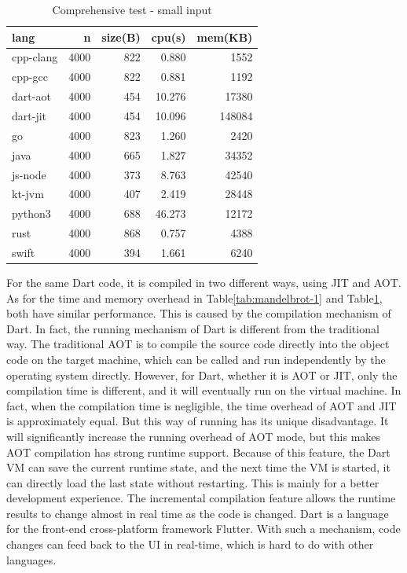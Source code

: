 \begin{table}[htbp]
    \caption{Comprehensive test - small input}
    \label{tab:mandelbrot-2}
    \begin{center}
        \begin{tabular}{lrrrr}
            \toprule
            lang      & n    & size(B) & cpu(s) & mem(KB) \\
            \midrule
            cpp-clang & 4000 & 822     & 0.880  & 1552    \\
            cpp-gcc   & 4000 & 822     & 0.881  & 1192    \\
            dart-aot  & 4000 & 454     & 10.276 & 17380   \\
            dart-jit  & 4000 & 454     & 10.096 & 148084  \\
            go        & 4000 & 823     & 1.260  & 2420    \\
            java      & 4000 & 665     & 1.827  & 34352   \\
            js-node   & 4000 & 373     & 8.763  & 42540   \\
            kt-jvm    & 4000 & 407     & 2.419  & 28448   \\
            python3   & 4000 & 688     & 46.273 & 12172   \\
            rust      & 4000 & 868     & 0.757  & 4388    \\
            swift     & 4000 & 394     & 1.661  & 6240    \\
            \bottomrule
        \end{tabular}
    \end{center}
\end{table}

For the same Dart code, it is compiled in two different ways,
using JIT and AOT. As for the time and memory overhead in Table\ref{tab:mandelbrot-1} and Table\ref{tab:mandelbrot-2},
both have similar performance. This is caused by the compilation mechanism of Dart. In fact, the running mechanism of Dart is different from the traditional way. The traditional AOT is to compile the source code directly into the object code on the target machine, which can be called and run independently by the operating system directly. However, for Dart, whether it is AOT or JIT, only the compilation time is different, and it will eventually run on the virtual machine. In fact, when the compilation time is negligible, the time overhead of AOT and JIT is approximately equal. But this way of running has its unique disadvantage. It will significantly increase the running overhead of AOT mode, but this makes AOT compilation has strong runtime support. Because of this feature, the Dart VM can save the current runtime state, and the next time the VM is started, it can directly load the last state without restarting. This is mainly for a better development experience. The incremental compilation feature allows the runtime results to change almost in real time as the code is changed. Dart is a language for the front-end cross-platform framework Flutter. With such a mechanism, code changes can feed back to the UI in real-time, which is hard to do with other languages.

